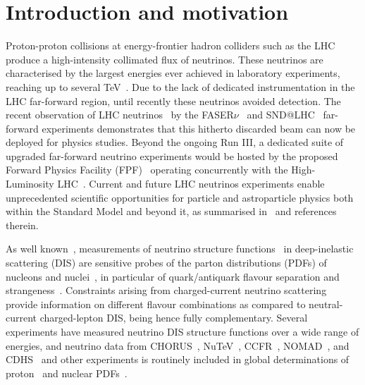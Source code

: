 \section{Introduction and motivation}
\label{sec:introduction}

Proton-proton collisions at energy-frontier hadron colliders
such as the LHC produce a high-intensity collimated flux of neutrinos.
%
These neutrinos are characterised by the largest energies ever achieved in laboratory experiments,
reaching up to several TeV~\cite{Kling:2021gos}.
%
Due to the lack of dedicated instrumentation in the LHC far-forward region,
until recently these neutrinos avoided detection.
%
The recent observation of LHC neutrinos~\cite{FASER:2023zcr,SNDLHC:2023pun} by the
  FASER$\nu$~\cite{FASER:2019dxq} and SND@LHC~\cite{SHiP:2020sos,SNDLHC:2022ihg} far-forward experiments
demonstrates that this hitherto discarded beam can now be deployed for physics studies.
%
Beyond the ongoing Run III, a dedicated suite of upgraded far-forward
neutrino experiments would be hosted by the proposed
Forward Physics Facility (FPF)~\cite{Anchordoqui:2021ghd,Feng:2022inv} operating
concurrently with the High-Luminosity LHC~\cite{Azzi:2019yne,Cepeda:2019klc}.
%
Current and future LHC neutrinos experiments enable unprecedented scientific opportunities
for particle and astroparticle physics both within the Standard Model and beyond it,
as summarised in~\cite{Anchordoqui:2021ghd,Feng:2022inv}
and references therein.

As well known~\cite{Conrad:1997ne,Mangano:2001mj},
measurements of neutrino structure functions~\cite{Candido:2023utz} in deep-inelastic scattering
(DIS) are sensitive probes of the parton distributions (PDFs)
of nucleons and nuclei~\cite{Ethier:2020way,Gao:2017yyd,Kovarik:2019xvh},  in particular
of quark/antiquark  flavour separation and
strangeness~\cite{NuTeV:2007uwm,CCFR:1994ikl,Faura:2020oom,Alekhin:2014sya}.
%
Constraints arising from charged-current neutrino scattering provide information on
different flavour combinations as compared to neutral-current charged-lepton DIS,
being hence fully complementary.
%
Several  experiments have measured neutrino
DIS structure functions over a wide range of energies, and neutrino data
from CHORUS~\cite{CHORUS:2005cpn}, NuTeV~\cite{NuTeV:2001dfo},
CCFR~\cite{Yang:2000ju}, NOMAD~\cite{NOMAD:2013hbk}, and CDHS~\cite{Berge:1989hr}
and other experiments is routinely  included in global
determinations of proton~\cite{NNPDF:2021njg,Hou:2019efy,Bailey:2020ooq} and nuclear
PDFs~\cite{Eskola:2021nhw,AbdulKhalek:2022fyi,Muzakka:2022wey}.

